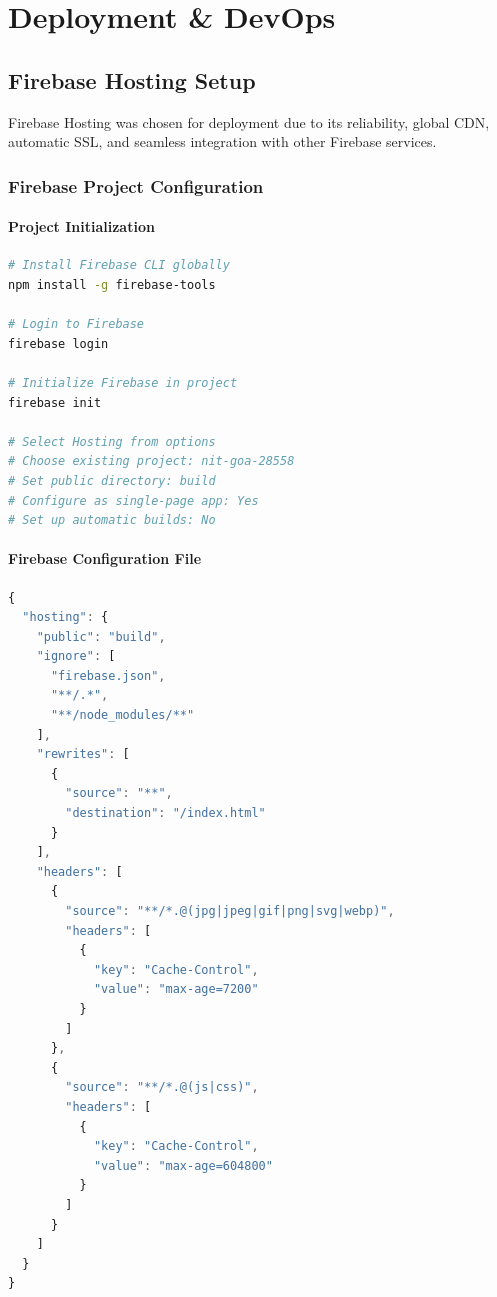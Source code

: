\documentclass[12pt,a4paper]{report}
\begin{document}
\chapter{Deployment \& DevOps}

\section{Firebase Hosting Setup}

Firebase Hosting was chosen for deployment due to its reliability, global CDN, automatic SSL, and seamless integration with other Firebase services.

\subsection{Firebase Project Configuration}

\subsubsection*{Project Initialization}
\begin{lstlisting}[language=bash, caption=Firebase Setup Commands]
# Install Firebase CLI globally
npm install -g firebase-tools

# Login to Firebase
firebase login

# Initialize Firebase in project
firebase init

# Select Hosting from options
# Choose existing project: nit-goa-28558
# Set public directory: build
# Configure as single-page app: Yes
# Set up automatic builds: No
\end{lstlisting}

\subsubsection*{Firebase Configuration File}
\begin{lstlisting}[language=JavaScript, caption=firebase.json Configuration]
{
  "hosting": {
    "public": "build",
    "ignore": [
      "firebase.json",
      "**/.*",
      "**/node_modules/**"
    ],
    "rewrites": [
      {
        "source": "**",
        "destination": "/index.html"
      }
    ],
    "headers": [
      {
        "source": "**/*.@(jpg|jpeg|gif|png|svg|webp)",
        "headers": [
          {
            "key": "Cache-Control",
            "value": "max-age=7200"
          }
        ]
      },
      {
        "source": "**/*.@(js|css)",
        "headers": [
          {
            "key": "Cache-Control",
            "value": "max-age=604800"
          }
        ]
      }
    ]
  }
}
\end{lstlisting}
\end{document}
